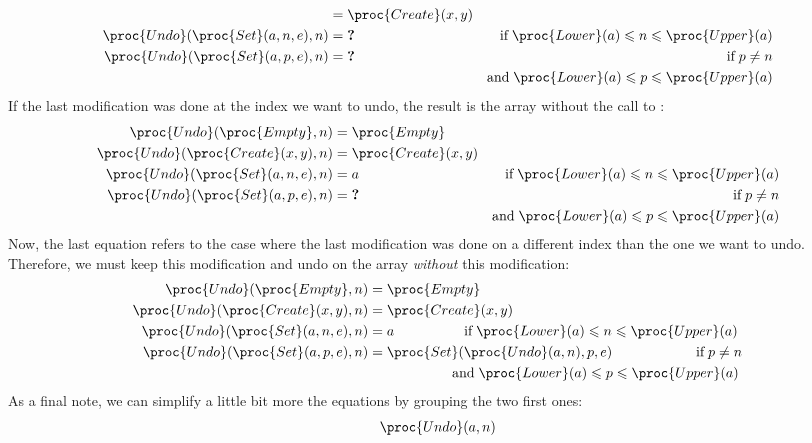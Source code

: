 \begin{itemize}
\begin{align*}
    &= \proc{Create} (x, y)\\
       \proc{Undo} (\proc{Set} (a, n, e), n)
    &= \textbf{?}
    & \text{if} \; \proc{Lower} (a) \leqslant n
      \leqslant \proc{Upper} (a)\\
       \proc{Undo} (\proc{Set} (a, p, e), n)
    &= \textbf{?}
    & \text{if} \; p \neq n\\
    && \text{and} \; \proc{Lower} (a) \leqslant p
      \leqslant \proc{Upper} (a)
    \end{align*}
    If the last modification was done at the index we want to undo,
    the result is the array without the call to :
    \begin{align*}
       \proc{Undo} (\proc{Empty}, n)
    &= \proc{Empty}\\
       \proc{Undo} (\proc{Create} (x, y), n)
    &= \proc{Create} (x, y)\\
       \proc{Undo} (\proc{Set} (a, n, e), n)
    &= a
    & \text{if} \; \proc{Lower} (a) \leqslant n
      \leqslant \proc{Upper} (a)\\
       \proc{Undo} (\proc{Set} (a, p, e), n)
    &= \textbf{?}
    & \text{if} \; p \neq n\\
    && \text{and} \; \proc{Lower} (a) \leqslant p
      \leqslant \proc{Upper} (a)
    \end{align*}
    Now, the last equation refers to the case where the last
    modification was done on a different index than the one we want to
    undo. Therefore, we must keep this modification and undo on the
    array \emph{without} this modification:
    \begin{align*}
       \proc{Undo} (\proc{Empty}, n)
    &= \proc{Empty}\\
       \proc{Undo} (\proc{Create} (x, y), n)
    &= \proc{Create} (x, y)\\
       \proc{Undo} (\proc{Set} (a, n, e), n)
    &= a
     \qquad\qquad\quad \text{if} \; \proc{Lower} (a) \leqslant n
      \leqslant \proc{Upper} (a)\\
       \proc{Undo} (\proc{Set} (a, p, e), n)
    &= \proc{Set} (\proc{Undo} (a, n), p, e)
     \qquad\qquad\qquad \text{if} \; p \neq n\\
    & \qquad \qquad \qquad \text{and} \; \proc{Lower} (a)
      \leqslant p \leqslant \proc{Upper} (a)
    \end{align*}
    As a final note, we can simplify a little bit more the equations
    by grouping the two first ones:
    \begin{align*}
       \proc{Undo} (a, n)

\end{align*}
\end{itemize}
